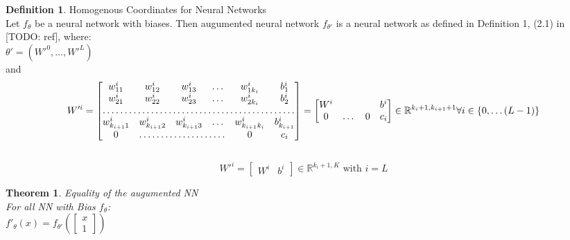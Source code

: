 \documentclass[a4paper]{article}
\newtheorem{theorem}{Theorem}[section]
\theoremstyle{definition}
\newtheorem{definition}{Definition}[section]
\begin{document}
\theoremstyle{definition}
\begin{definition}{Homogenous Coordinates for Neural Networks}\\
Let $f_{\theta}$ be a neural network with biases. Then augumented neural network $f_{\theta'}$ is a neural network as defined in Definition 1, (2.1) in [TODO: ref], where:\\
$\theta' = (W'^0, \dots, W'^L)$\\
and\\
\[
W'^i=\begin{bmatrix}
    w_{11}^i       & w_{12}^i & w_{13}^i & \dots & w_{1k_i}^i & b_1^i\\
    w_{21}^i       & w_{22}^i & w_{23}^i & \dots & w_{2k_i}^i & b_2^i\\
    \hdotsfor{6} \\
	w_{k_{i+1}1}^i       & w_{k_{i+1}2}^i & w_{k_{i+1}3}^i & \dots & w_{k_{i+1}k_i}^i & b_{k_{i+1}}^i\\
	0 & \hdotsfor{3} & 0 & c_i
\end{bmatrix}
= 
\begin{bmatrix}
    W^i & & & b^i\\
	0 & \dots & 0 & c_i
\end{bmatrix} \in \mathbb{R}^{k_i + 1, k_{i + 1} + 1}  \forall i \in \{0, \dots (L-1)\}
\]\\
\[
W'^i=
\begin{bmatrix}
    W^i & b^i
\end{bmatrix} \in \mathbb{R}^{k_i + 1, K}  \text{ with } i = L
\]
\end{definition}

\begin{theorem}{Equality of the augumented NN}\\
For all NN with Bias $f_{\theta}$:\\
$f'_{\theta}(x)=f_{\theta'}(\begin{bmatrix}     x\\     1 \end{bmatrix})$
\end{theorem}
\end{document}
